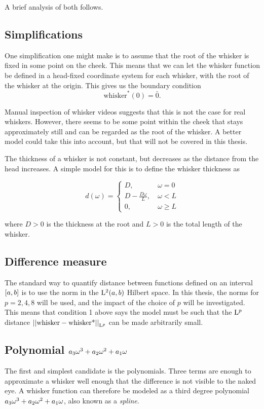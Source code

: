 A brief analysis of both follows.

\subsection{Simplifications}
One simplification one might make is to assume that the root of the
whisker is fixed in some point on the cheek. This means that we can
let the whisker function be defined in a head-fixed coordinate system
for each whisker, with the root of the whisker at the origin. This
gives us the boundary condition
\begin{equation}
    \label{eq:bv_root}
    \text{whisker}^*(0)=\bar{0}.
\end{equation}

Manual inspection of whisker videos suggests that this is not the case
for real whiskers. However, there seems to be some point within the
cheek that stays approximately still and can be regarded as the root
of the whisker. A better model could take this into account, but that
will not be covered in this thesis.

The thickness of a whisker is not constant, but decreases as the
distance from the head increases. A simple model for this is to define
the whisker thickness as

\begin{equation}
    d(\omega) = \begin{cases}
        D,~& \omega=0\\
        D-\frac{D\omega}{L},~& \omega<L\\
        0,~& \omega\ge L
    \end{cases}
\end{equation}

where $D>0$ is the thickness at the root and $L>0$ is the total length of the
whisker.


\subsection{Difference measure}
The standard way to quantify distance between functions defined on an
interval $\interval{a}{b}$ is to use the norm in the $\Lp[2](a, b)$
Hilbert space. In this thesis, the norms for $p = 2, 4, 8$ will be
used, and the impact of the choice of $p$ will be investigated. This
means that condition 1 above says the model must be such that the
$\Lp$ distance $\Lpnorm{\text{whisker} - \text{whisker*}}$ can be made
arbitrarily small.


\subsection{Polynomial $\Spline{\omega}$}
The first and simplest candidate is the polynomials. Three terms are
enough to approximate a whisker well enough that the difference is not
visible to the naked eye. A whisker function can therefore be modeled
as a third degree polynomial $\Spline{\omega}$, also known as a
\emph{spline}.

